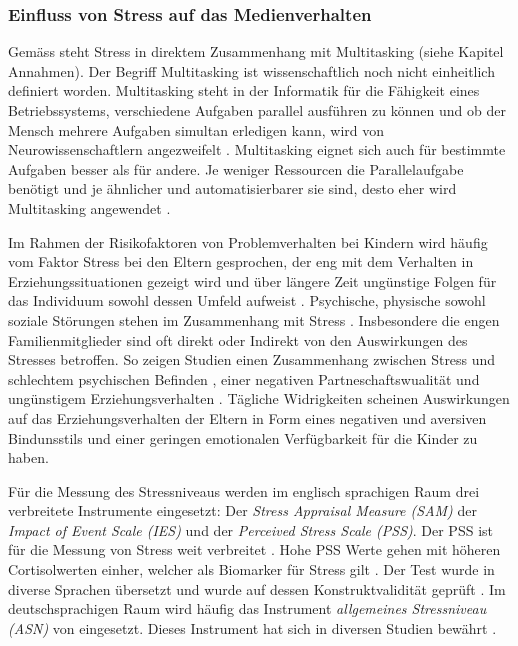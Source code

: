 \subsubsection{Einfluss von Stress auf das Medienverhalten}
Gemäss  steht Stress in direktem Zusammenhang mit Multitasking (siehe Kapitel Annahmen). Der Begriff Multitasking ist wissenschaftlich noch nicht einheitlich definiert worden. Multitasking steht in der Informatik für die Fähigkeit eines Betriebssystems, verschiedene Aufgaben parallel ausführen zu können  und ob der Mensch mehrere Aufgaben simultan erledigen kann, wird von Neurowissenschaftlern angezweifelt \cite{Zimber2016}. Multitasking eignet sich auch für bestimmte Aufgaben besser als für andere. Je weniger Ressourcen die Parallelaufgabe benötigt und je ähnlicher und automatisierbarer sie sind, desto eher wird Multitasking angewendet \cite[S.~10]{Zimber2016}.

Im Rahmen der Risikofaktoren von Problemverhalten bei Kindern wird häufig vom Faktor Stress bei den Eltern gesprochen, der eng mit dem Verhalten in Erziehungssituationen gezeigt wird und über längere Zeit ungünstige Folgen für das Individuum sowohl dessen Umfeld aufweist \cite{Cina2009}. Psychische, physische sowohl soziale Störungen stehen im Zusammenhang mit Stress \cite{Elfering2002, Burisch1994}. Insbesondere die engen Familienmitglieder sind oft direkt oder Indirekt von den Auswirkungen des Stresses betroffen. So zeigen Studien einen Zusammenhang zwischen Stress und schlechtem psychischen Befinden \cite{Burisch1994, Krohne1997}, einer negativen Partneschaftswualität \cite{Bodenmann2000, Bodenmann1999, Bodenmann2000a} und ungünstigem Erziehungsverhalten \cite{Abidin1992, Belsky1984, WebsterStratton2000}. Tägliche Widrigkeiten scheinen Auswirkungen auf das Erziehungsverhalten der Eltern in Form eines negativen und aversiven Bindunsstils \cite{Dumas1989, Webster-Stratton1988} und einer geringen emotionalen Verfügbarkeit für die Kinder \cite{Campbell1991} zu haben.

Für die Messung des Stressniveaus werden im englisch sprachigen Raum drei verbreitete Instrumente eingesetzt: Der \textit{Stress Appraisal Measure (SAM)} der \textit{Impact of Event Scale (IES)} und der \textit{Perceived Stress Scale (PSS)}. Der PSS ist für die Messung von Stress weit verbreitet \cite{Andreou2011}. Hohe PSS Werte gehen mit höheren Cortisolwerten einher, welcher als Biomarker für Stress gilt \cite{Malarkey1995, VanEck2005}. Der Test wurde in diverse Sprachen übersetzt und wurde auf dessen Konstruktvalidität geprüft \cite{Cohen1988, Byrne2005}. Im deutschsprachigen Raum wird häufig das Instrument \textit{allgemeines Stressniveau (ASN)} von  eingesetzt. Dieses Instrument hat sich in diversen Studien bewährt \cite{Cina2009}.
 
